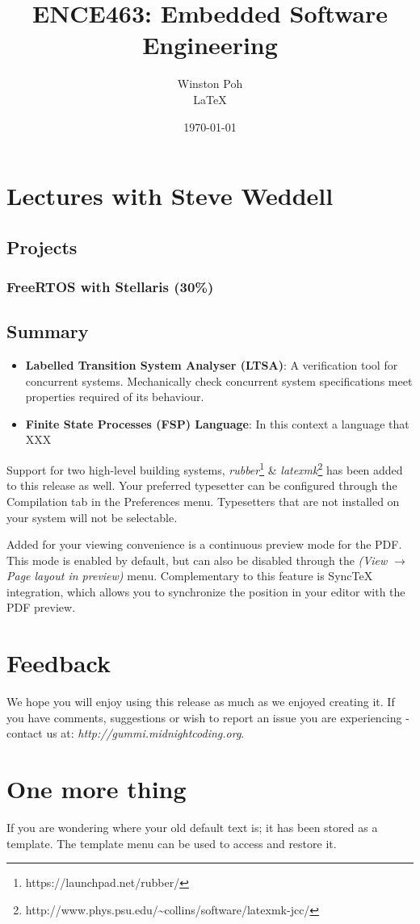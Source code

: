 \documentclass[12pt]{article}
\title{\textbf{ENCE463: Embedded Software Engineering}}
\author{Winston Poh\\{\LaTeX} }
\date{\today}
\begin{document}
\maketitle

\section{Lectures with Steve Weddell}
\subsection{Projects}
\subsubsection{FreeRTOS with Stellaris (30\%)}

\subsection{Summary}
\begin{itemize}
	\item \textbf{Labelled Transition System Analyser (LTSA)}: A verification tool for concurrent systems. Mechanically check concurrent system specifications meet properties required of its behaviour.
	\item \textbf{Finite State Processes (FSP) Language}: In this context a language that XXX
\end{itemize}


Support for two high-level building systems, \emph{rubber}\footnote{https://launchpad.net/rubber/} \& \emph{latexmk}\footnote{http://www.phys.psu.edu/{\textasciitilde}collins/software/latexmk-jcc/} has been added to this release as well. Your preferred typesetter can be configured through the Compilation tab in the Preferences menu. Typesetters that are not installed on your system will not be selectable. 

Added for your viewing convenience is a continuous preview mode for the PDF. This mode is enabled by default, but can also be disabled through the \emph{(View $\rightarrow$ Page layout in preview)} menu. Complementary to this feature is SyncTeX integration, which allows you to synchronize the position in your editor with the PDF preview. 

\section{Feedback}
We hope you will enjoy using this release as much as we enjoyed creating it. If you have comments, suggestions or wish to report an issue you are experiencing - contact us at: \emph{http://gummi.midnightcoding.org}.

\section{One more thing}
If you are wondering where your old default text is; it has been stored as a template. The template menu can be used to access and restore it. 
\end{document}
